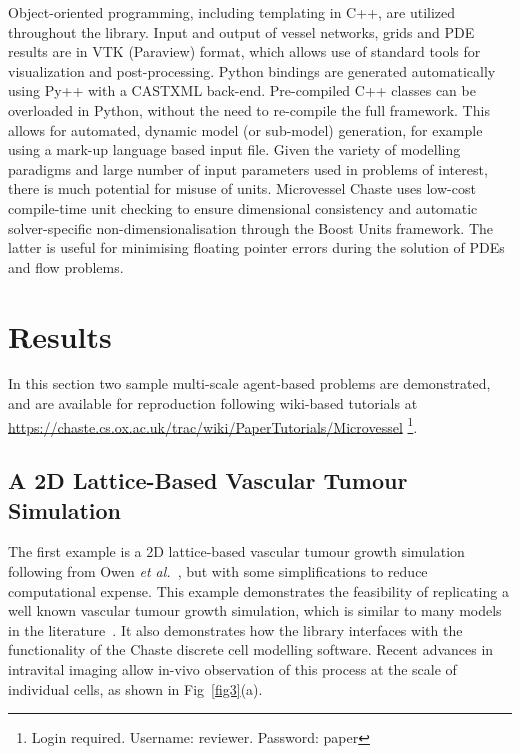 \documentclass[10pt,letterpaper]{article}
\begin{document}
Object-oriented programming, including templating in C++, are utilized throughout the library. Input and output of vessel networks, grids and PDE results are in VTK (Paraview) format, which allows use of standard tools for visualization and post-processing. Python bindings are generated automatically using Py++ with a CASTXML back-end. Pre-compiled C++ classes can be overloaded in Python, without the need to re-compile the full framework. This allows for automated, dynamic model (or sub-model) generation, for example using a mark-up language based input file. Given the variety of modelling paradigms and large number of input parameters used in problems of interest, there is much potential for misuse of units. Microvessel Chaste uses low-cost compile-time unit checking to ensure dimensional consistency and automatic solver-specific non-dimensionalisation through the Boost Units framework. The latter is useful for minimising floating pointer errors during the solution of PDEs and flow problems.

\section*{Results}

In this section two sample multi-scale agent-based problems are demonstrated, and are available for reproduction following wiki-based tutorials at \url{https://chaste.cs.ox.ac.uk/trac/wiki/PaperTutorials/Microvessel} \footnote{Login required. Username: reviewer. Password: paper}.

\subsection*{A 2D Lattice-Based Vascular Tumour Simulation}

The first example is a 2D lattice-based vascular tumour growth simulation following from Owen \emph{et al.}~\cite{Owen2011}, but with some simplifications to reduce computational expense. This example demonstrates the feasibility of replicating a well known vascular tumour growth simulation, which is similar to many models in the literature~\cite{Anderson1998, Frieboes2007, Perfahl2011, Connor2015}. It also demonstrates how the library interfaces with the functionality of the Chaste discrete cell modelling software. Recent advances in intravital imaging allow in-vivo observation of this process at the scale of individual cells, as shown in Fig~\ref{fig3}(a)\cite{Grogan2016}.  
\end{document}
